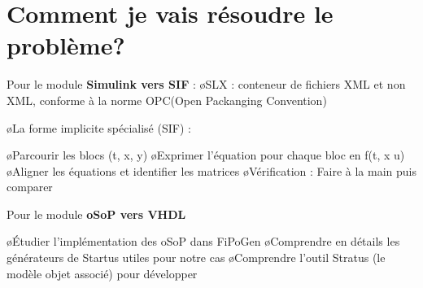 \section{Comment je vais résoudre le problème?}

\begin{frame} 
	Pour le module \textbf{Simulink vers SIF} :  
    \BI
		\o SLX : conteneur de fichiers XML et non XML, conforme à la norme OPC(Open Packanging Convention)
		\smallskip
		\begin{center}
		\end{center}	 
	\EI
	\note{
	}
\end{frame}

\begin{frame} 
	
		\BI
		\o La forme implicite spécialisé (SIF) : 
		\bigskip
		\begin{center}
		\end{center}	 

		\o Parcourir les blocs (t, x, y) 
		\o Exprimer l'équation pour chaque bloc en f(t, x u)
		\o Aligner les équations et identifier les matrices
		\o Vérification :  Faire à la main puis comparer
		\EI
\end{frame}

\begin{frame} 
	Pour le module \textbf{oSoP vers VHDL} 
		\smallskip
		\begin{center}
		\end{center}
	\BI
		\o \'Etudier l'implémentation des oSoP dans FiPoGen
		\o Comprendre en détails les générateurs de Startus utiles pour notre cas
		\o Comprendre l'outil Stratus (le modèle objet associé) pour développer
	\EI
\end{frame}


